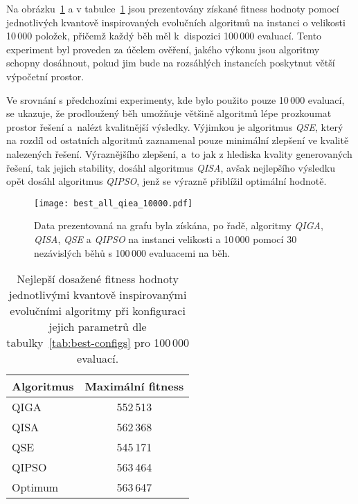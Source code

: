Na obrázku~\ref{fig:best-100k} a v tabulce~\ref{tab:max-fitness-10000} jsou prezentovány získané fitness hodnoty pomocí jednotlivých kvantově inspirovaných evolučních algoritmů na instanci o velikosti 10\,000 položek, přičemž každý běh měl k~dispozici 100\,000 evaluací.
Tento experiment byl proveden za účelem ověření, jakého výkonu jsou algoritmy schopny dosáhnout, pokud jim bude na rozsáhlých instancích poskytnut větší výpočetní prostor.

Ve srovnání s předchozími experimenty, kde bylo použito pouze 10\,000 evaluací, se ukazuje, že prodloužený běh umožňuje většině algoritmů lépe prozkoumat prostor řešení a~nalézt kvalitnější výsledky. 
Výjimkou je algoritmus \emph{QSE}, který na rozdíl od ostatních algoritmů zaznamenal pouze minimální zlepšení ve kvalitě nalezených řešení. 
Výraznějšího zlepšení, a~to jak z hlediska kvality generovaných řešení, tak jejich stability, dosáhl algoritmus \emph{QISA}, avšak nejlepšího výsledku opět dosáhl algoritmus \emph{QIPSO}, jenž se výrazně přiblížil optimální hodnotě. 

\begin{figure}[ht!]
    \centering
    \texttt{[image: best\_all\_qiea\_10000.pdf]}
    \caption{Data prezentovaná na grafu byla získána, po řadě, algoritmy \emph{QIGA}, \emph{QISA}, \emph{QSE} a \emph{QIPSO} na instanci velikosti a 10\,000 pomocí 30 nezávislých běhů s 100\,000 evaluacemi na běh.}
    \label{fig:best-100k}
\end{figure}

\begin{table}[ht]
    \centering
    \begin{tabular}{l c}
        \toprule
        \textbf{Algoritmus} & \textbf{Maximální fitness} \\
        \midrule
        QIGA    & 552\,513 \\[1ex]
        QISA    & 562\,368 \\[1ex]
        QSE     & 545\,171 \\[1ex]
        QIPSO   & 563\,464 \\
        \midrule
        Optimum & 563\,647 \\
        \bottomrule
    \end{tabular}
    \caption{Nejlepší dosažené fitness hodnoty jednotlivými kvantově inspirovanými evolučními algoritmy při konfiguraci jejich parametrů dle tabulky~\ref{tab:best-configs} pro 100\,000 evaluací.}
    \label{tab:max-fitness-10000}
\end{table}

